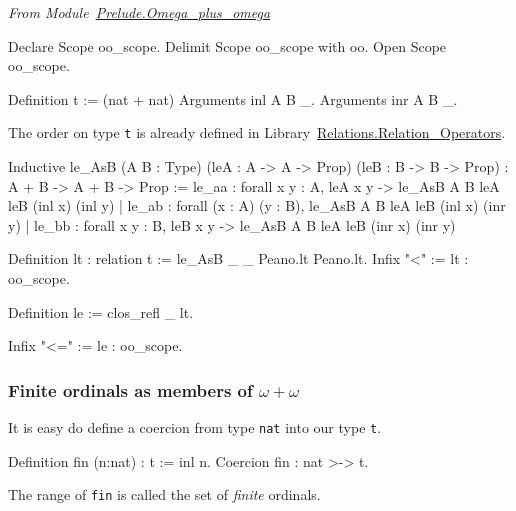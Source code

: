 \vspace{4pt}
\noindent\emph{From Module~\href{../src/html/hydras.Prelude.Omega_plus_omega.html}{Prelude.Omega\_plus\_omega}}


\begin{Coqsrc}
Declare Scope oo_scope.
Delimit Scope oo_scope with oo.
Open Scope oo_scope.

Definition t := (nat + nat)%
Arguments inl  {A B} _.
Arguments inr  {A B} _.
\end{Coqsrc}

The order on type \texttt{t} is already defined in
Library~\href{https://coq.inria.fr/distrib/current/stdlib/Coq.Relations.Relation_Operators.html}{Relations.Relation\_Operators}.

\begin{Coqanswer}
Inductive
le_AsB (A B : Type) (leA : A -> A -> Prop) (leB : B -> B -> Prop)
  : A + B -> A + B -> Prop :=
    le_aa : forall x y : A, leA x y -> le_AsB A B leA leB (inl x) (inl y)
  | le_ab : forall (x : A) (y : B), le_AsB A B leA leB (inl x) (inr y)
  | le_bb : forall x y : B, leB x y -> le_AsB A B leA leB (inr x) (inr y)
\end{Coqanswer}

\begin{Coqsrc}
Definition lt : relation t := le_AsB _ _ Peano.lt Peano.lt.
Infix "<" := lt : oo_scope.

Definition le := clos_refl _ lt.

Infix "<=" := le : oo_scope.
\end{Coqsrc}

\subsubsection{Finite ordinals as members of \texorpdfstring{$\omega+\omega$}{omega+omega}}

It is easy do define a coercion from type \texttt{nat} into our type \texttt{t}.

\begin{Coqsrc}
Definition fin (n:nat) : t := inl n.
Coercion fin : nat >-> t.
\end{Coqsrc}

The range of \texttt{fin} is called the set of \emph{finite} ordinals.


